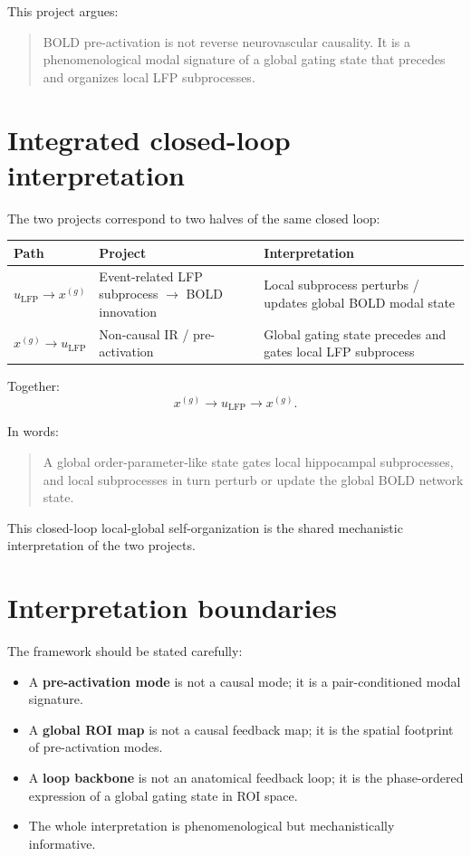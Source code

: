\documentclass[11pt,a4paper]{article}
\begin{document}
This project argues:
\begin{quote}
BOLD pre-activation is not reverse neurovascular causality. It is a phenomenological modal signature of a global gating state that precedes and organizes local LFP subprocesses.
\end{quote}

\section{Integrated closed-loop interpretation}

The two projects correspond to two halves of the same closed loop:

\begin{longtable}{p{}p{}p{}}
\toprule
\textbf{Path} & \textbf{Project} & \textbf{Interpretation} \\
\midrule
$u_{\mathrm{LFP}} \rightarrow x^{(g)}$ & Event-related LFP subprocess $\to$ BOLD innovation & Local subprocess perturbs / updates global BOLD modal state \\
$x^{(g)} \rightarrow u_{\mathrm{LFP}}$ & Non-causal IR / pre-activation & Global gating state precedes and gates local LFP subprocess \\
\bottomrule
\end{longtable}

Together:
\begin{equation}
    x^{(g)} \rightarrow u_{\mathrm{LFP}} \rightarrow x^{(g)}.
\end{equation}

In words:
\begin{quote}
A global order-parameter-like state gates local hippocampal subprocesses, and local subprocesses in turn perturb or update the global BOLD network state.
\end{quote}

This closed-loop local-global self-organization is the shared mechanistic interpretation of the two projects.

\section{Interpretation boundaries}

The framework should be stated carefully:
\begin{itemize}
    \item A \textbf{pre-activation mode} is not a causal mode; it is a pair-conditioned modal signature.
    \item A \textbf{global ROI map} is not a causal feedback map; it is the spatial footprint of pre-activation modes.
    \item A \textbf{loop backbone} is not an anatomical feedback loop; it is the phase-ordered expression of a global gating state in ROI space.
    \item The whole interpretation is phenomenological but mechanistically informative.
\end{itemize}
\end{document}
